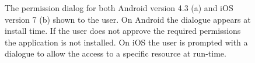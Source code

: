 \begin{figure}[!t]
    \centering
    \caption[The permission dialog for both Android and iOS shown to the user]{The permission dialog for both Android version 4.3 (a) and iOS version 7 (b) shown to the user. On Android the dialogue appears at install time. If the user does not approve the required permissions the application is not installed. On iOS the user is prompted with a dialogue to allow the access to a specific resource at run-time.}
    \label{fig:bg_permissions}
\end{figure}

